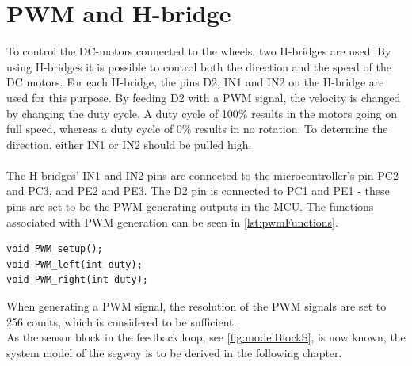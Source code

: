 \section{PWM and H-bridge}
To control the DC-motors connected to the wheels, two H-bridges are used. By using H-bridges it is possible to control both the direction and the speed of the DC motors. For each H-bridge, the pins D2, IN1 and IN2 on the H-bridge are used for this purpose. By feeding D2 with a PWM signal, the velocity is changed by changing the duty cycle. A duty cycle of 100\% results in the motors going on full speed, whereas a duty cycle of 0\% results in no rotation. To determine the direction, either IN1 or IN2 should be pulled high. \\\\
The H-bridges' IN1 and IN2 pins are connected to the microcontroller's pin PC2 and PC3, and PE2 and PE3. The D2 pin is connected to PC1 and PE1 - these pins are set to be the PWM generating outputs in the MCU. The functions associated with PWM generation can be seen in \autoref{lst:pwmFunctions}.

\begin{lstlisting}
void PWM_setup();
void PWM_left(int duty);
void PWM_right(int duty);
\end{lstlisting}

When generating a PWM signal, the resolution of the PWM signals are set to 256 counts, which is considered to be sufficient.\\
As the sensor block in the feedback loop, see \autoref{fig:modelBlockS}, is now known, the system model of the segway is to be derived in the following chapter. 



